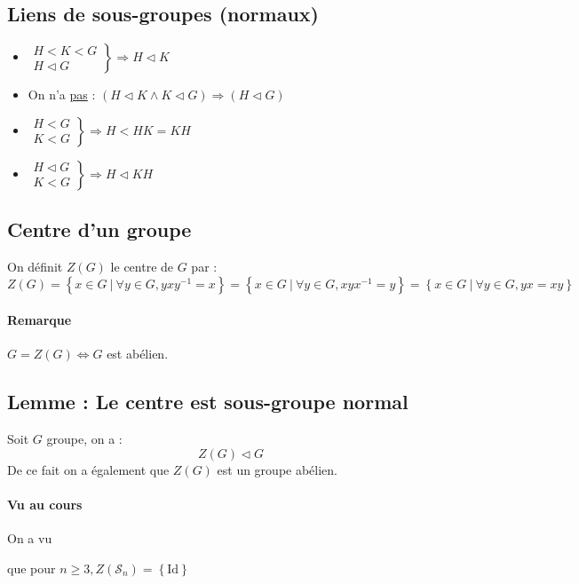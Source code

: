 \documentclass[a4paper,10pt]{report}
\newcommand{\set}[1]{\left\lbrace #1 \right\rbrace } %
\newcommand{\so}{\Rightarrow}
\newcommand{\id}{\mathrm{Id}} %
\newcommand{\mfootnote}[1]{\up{(}\footnote{#1}\up{)}}
\newcommand{\such}{\ \Big| \ }
\begin{document}
   \subsection{Liens de sous-groupes (normaux)}
   \begin{itemize}
     \item $\left.
       \begin{array}{r}
	 H < K < G\\
	 H \triangleleft G
       \end{array}\right\} \so H \triangleleft K$
     \item On n'a \underline{pas} :  $(H \triangleleft K \land K \triangleleft G)
       \so (H \triangleleft G)$
     \item $\left.
       \begin{array}{r}
	 H < G\\
	 K < G
       \end{array}\right\}
       \so H < HK =KH
       $
     \item $\left.
       \begin{array}{r}
	 H \triangleleft G\\
	 K < G
       \end{array}\right\}
       \so H \triangleleft KH
       $
   \end{itemize}

   \subsection{Centre d'un groupe}
    On définit $Z(G)$ le centre de $G$ par : 
    $$Z(G)=\set{x \in G \such \forall y \in G, yxy^{-1}=x}=\set{x \in G \such
    \forall y \in G, xyx^{-1}=y}=\set{x \in G \such \forall y \in G, yx=xy}$$
    
    \paragraph{Remarque} $G = Z(G) \iff G$ est abélien. 
   
   \subsection{Lemme : Le centre est sous-groupe normal} Soit $G$ groupe, on a :
    $$Z(G) \triangleleft G$$ De ce fait on a également que $Z(G)$ est un groupe
    abélien.

    \paragraph{Vu au cours} On a vu
    \begin{comment}
      \mfootnote{Preuve : CM 15/10/08 p1 verso} 
    \end{comment}
    que pour $n \geq 3, Z(\mathcal{S}_n)=\set{\id}$
\end{document}

